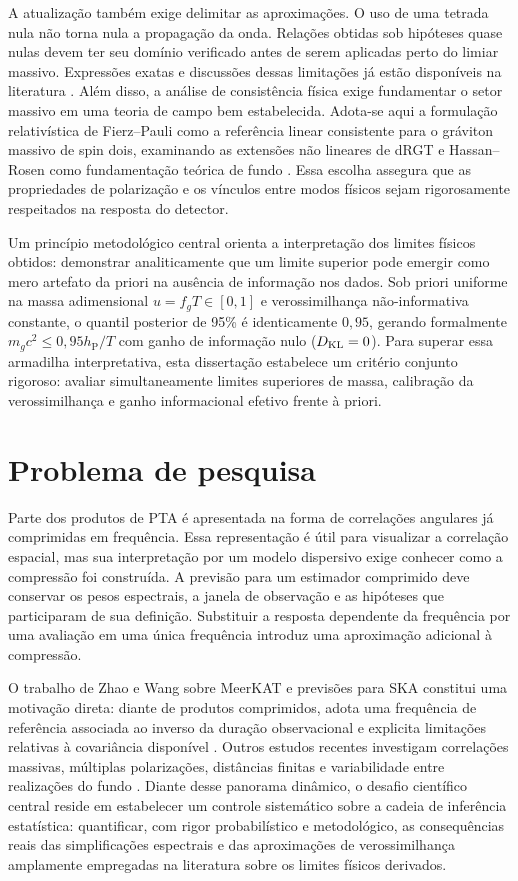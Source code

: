 A atualização também exige delimitar as aproximações. O uso de uma
tetrada nula não torna nula a propagação da onda. Relações obtidas sob
hipóteses quase nulas devem ter seu domínio verificado antes de serem
aplicadas perto do limiar massivo. Expressões exatas e discussões dessas
limitações já estão disponíveis na literatura \autocite{hyun2019}.
Além disso, a análise de consistência física exige fundamentar o setor
massivo em uma teoria de campo bem estabelecida. Adota-se aqui a formulação
relativística de Fierz--Pauli como a referência linear consistente para o
gráviton massivo de spin dois, examinando as extensões não lineares de dRGT
e Hassan--Rosen como fundamentação teórica de fundo
\autocite{visser1998,park2010,derham2011,hassan2012}. Essa escolha assegura
que as propriedades de polarização e os vínculos entre modos físicos sejam
rigorosamente respeitados na resposta do detector.

Um princípio metodológico central orienta a interpretação dos limites físicos
obtidos: demonstrar analiticamente que um limite superior pode emergir como mero
artefato da priori na ausência de informação nos dados. Sob priori uniforme na
massa adimensional $u=f_gT\in[0,1]$ e verossimilhança não-informativa constante,
o quantil posterior de 95\% é identicamente $0,95$, gerando formalmente
$m_gc^2\leq0,95h_{\mathrm P}/T$ com ganho de informação nulo ($D_{\rm KL}=0$).
Para superar essa armadilha interpretativa, esta dissertação estabelece um
critério conjunto rigoroso: avaliar simultaneamente limites superiores de massa,
calibração da verossimilhança e ganho informacional efetivo frente à priori.

\section{Problema de pesquisa}

Parte dos produtos de PTA é apresentada na forma de correlações
angulares já comprimidas em frequência. Essa representação é útil para
visualizar a correlação espacial, mas sua interpretação por um modelo
dispersivo exige conhecer como a compressão foi construída. A previsão
para um estimador comprimido deve conservar os pesos espectrais, a
janela de observação e as hipóteses que participaram de sua definição.
Substituir a resposta dependente da frequência por uma avaliação em uma
única frequência introduz uma aproximação adicional à compressão.

O trabalho de Zhao e Wang sobre MeerKAT e previsões para SKA constitui
uma motivação direta: diante de produtos comprimidos, adota uma
frequência de referência associada ao inverso da duração observacional
e explicita limitações relativas à covariância disponível
\autocite{zhao2026}. Outros estudos recentes investigam correlações
massivas, múltiplas polarizações, distâncias finitas e variabilidade
entre realizações do fundo \autocite{choi2025,cordes2025,wu2025}.
Diante desse panorama dinâmico, o desafio científico central reside em
estabelecer um controle sistemático sobre a cadeia de inferência estatística:
quantificar, com rigor probabilístico e metodológico, as consequências
reais das simplificações espectrais e das aproximações de verossimilhança
amplamente empregadas na literatura sobre os limites físicos derivados.

